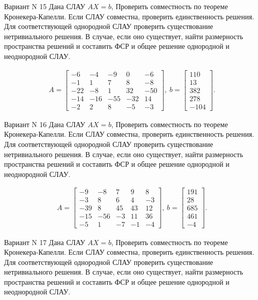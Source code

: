 \documentclass[11pt]{report}
\begin{document}
Вариант N 15
Дана СЛАУ $AX = b$,
Проверить совместность по теореме Кронекера-Капелли. Если СЛАУ совместна, проверить единственность решения.
Для соответствующей однородной СЛАУ проверить существование нетривиального решения. В случае, если оно существует,
найти размерность пространства решений и составить ФСР и общее решение однородной  и неоднородной СЛАУ.


\begin{align*}
 A = \left[\begin{matrix}-6 & -4 & -9 & 0 & -6\\-1 & 1 & 7 & 8 & -8\\-22 & -8 & 1 & 32 & -50\\-14 & -16 & -55 & -32 & 14\\-2 & 2 & 8 & -5 & -3\end{matrix}\right],
\ b = \left[\begin{matrix}110\\13\\382\\278\\-104\end{matrix}\right]. 
 \end{align*}

Вариант N 16
Дана СЛАУ $AX = b$,
Проверить совместность по теореме Кронекера-Капелли. Если СЛАУ совместна, проверить единственность решения.
Для соответствующей однородной СЛАУ проверить существование нетривиального решения. В случае, если оно существует,
найти размерность пространства решений и составить ФСР и общее решение однородной  и неоднородной СЛАУ.


\begin{align*}
 A = \left[\begin{matrix}-9 & -8 & 7 & 9 & 8\\-3 & 8 & 6 & 4 & -3\\-39 & 8 & 45 & 43 & 12\\-15 & -56 & -3 & 11 & 36\\-5 & 1 & -7 & -1 & -4\end{matrix}\right],
\ b = \left[\begin{matrix}191\\28\\685\\461\\-4\end{matrix}\right]. 
 \end{align*}

Вариант N 17
Дана СЛАУ $AX = b$,
Проверить совместность по теореме Кронекера-Капелли. Если СЛАУ совместна, проверить единственность решения.
Для соответствующей однородной СЛАУ проверить существование нетривиального решения. В случае, если оно существует,
найти размерность пространства решений и составить ФСР и общее решение однородной  и неоднородной СЛАУ.
\end{document}
